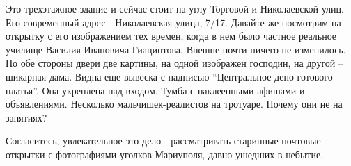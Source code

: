 
Это трехэтажное здание и сейчас стоит на углу Торговой и Николаевской улиц.
Его современный адрес - Николаевская улица, 7/17. Давайте же посмотрим на
открытку с его изображением тех времен, когда в нем было частное реальное
училище Василия Ивановича Гиацинтова. Внешне почти ничего не изменилось. По обе
стороны двери две картины, на одной изображен господин, на другой – шикарная
дама. Видна еще вывеска с надписью \enquote{Центральное депо готового платья}.
Она укреплена над входом.  Тумба с наклеенными афишами и объявлениями.
Несколько мальчишек-реалистов на тротуаре. Почему они не на занятиях?

Согласитесь, увлекательное это дело - рассматривать старинные почтовые открытки
с фотографиями уголков Мариуполя, давно ушедших в небытие.
